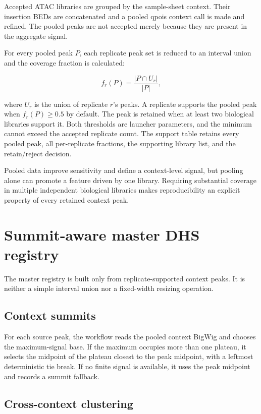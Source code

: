 \documentclass[11pt]{article}
\begin{document}
Accepted ATAC libraries are grouped by the sample-sheet context.  Their
insertion BEDs are concatenated and a pooled qpois context call is made and
refined.  The pooled peaks are not accepted merely because they are present in
the aggregate signal.

For every pooled peak \(P\), each replicate peak set is reduced to an interval
union and the coverage fraction is calculated:

\[
  f_r(P) = \frac{|P \cap U_r|}{|P|},
\]

where \(U_r\) is the union of replicate \(r\)'s peaks.  A replicate supports
the pooled peak when \(f_r(P) \geq 0.5\) by default.  The peak is retained when
at least two biological libraries support it.  Both thresholds are launcher
parameters, and the minimum cannot exceed the accepted replicate count.  The
support table retains every pooled peak, all per-replicate fractions, the
supporting library list, and the retain/reject decision.

Pooled data improve sensitivity and define a context-level signal, but pooling
alone can promote a feature driven by one library.  Requiring substantial
coverage in multiple independent biological libraries makes reproducibility
an explicit property of every retained context peak.

\section{Summit-aware master DHS registry}

The master registry is built only from replicate-supported context peaks.  It
is neither a simple interval union nor a fixed-width resizing operation.

\subsection{Context summits}

For each source peak, the workflow reads the pooled context BigWig and chooses
the maximum-signal base.  If the maximum occupies more than one plateau, it
selects the midpoint of the plateau closest to the peak midpoint, with a
leftmost deterministic tie break.  If no finite signal is available, it uses
the peak midpoint and records a summit fallback.

\subsection{Cross-context clustering}
\end{document}
